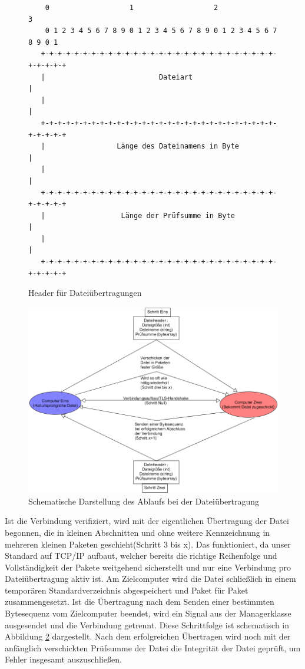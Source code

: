\begin{figure}[h]
\begin{lstlisting}
	0                   1                   2                   3
    0 1 2 3 4 5 6 7 8 9 0 1 2 3 4 5 6 7 8 9 0 1 2 3 4 5 6 7 8 9 0 1
   +-+-+-+-+-+-+-+-+-+-+-+-+-+-+-+-+-+-+-+-+-+-+-+-+-+-+-+-+-+-+-+-+
   |                           Dateiart                            |
   |                                                               |
   +-+-+-+-+-+-+-+-+-+-+-+-+-+-+-+-+-+-+-+-+-+-+-+-+-+-+-+-+-+-+-+-+
   |                 Länge des Dateinamens in Byte                 |
   |                                                               |
   +-+-+-+-+-+-+-+-+-+-+-+-+-+-+-+-+-+-+-+-+-+-+-+-+-+-+-+-+-+-+-+-+
   |                  Länge der Prüfsumme in Byte                  |
   |                                                               |
   +-+-+-+-+-+-+-+-+-+-+-+-+-+-+-+-+-+-+-+-+-+-+-+-+-+-+-+-+-+-+-+-+
\end{lstlisting}
\caption{Header für Dateiübertragungen}
\label{Datei_Header}
\end{figure}

\begin{figure}
\includegraphics[scale=.3]{diagramFileProtocol}
\caption{Schematische Darstellung des Ablaufs bei der Dateiübertragung}
\label{file_diagram}
\end{figure}

Ist die Verbindung verifiziert, wird mit der eigentlichen Übertragung der Datei begonnen, die in kleinen Abschnitten und ohne weitere Kennzeichnung in mehreren kleinen Paketen geschieht(Schritt 3 bis x).
Das funktioniert, da unser Standard auf TCP/IP aufbaut, welcher bereits die richtige Reihenfolge und Vollständigkeit der Pakete weitgehend sicherstellt und nur eine Verbindung pro Dateiübertragung aktiv ist.
Am Zielcomputer wird die Datei schließlich in einem temporären Standardverzeichnis abgespeichert und Paket für Paket zusammengesetzt.
Ist die Übertragung nach dem Senden einer bestimmten Bytesequenz vom Zielcomputer beendet, wird ein Signal aus der Managerklasse ausgesendet und die Verbindung getrennt.
Diese Schrittfolge ist schematisch in Abbildung \ref{file_diagram} dargestellt.
Nach dem erfolgreichen Übertragen wird noch mit der anfänglich verschickten Prüfsumme der Datei die Integrität der Datei geprüft, um Fehler insgesamt auszuschließen.

